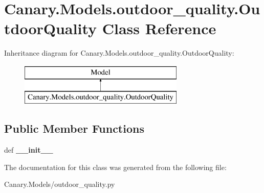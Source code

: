 \hypertarget{class_canary_8_models_1_1outdoor__quality_1_1_outdoor_quality}{\section{Canary.\-Models.\-outdoor\-\_\-quality.\-Outdoor\-Quality Class Reference}
\label{class_canary_8_models_1_1outdoor__quality_1_1_outdoor_quality}
}
Inheritance diagram for Canary.\-Models.\-outdoor\-\_\-quality.\-Outdoor\-Quality\-:\begin{figure}[H]
\begin{center}
\leavevmode
\includegraphics[height=2.000000cm]{class_canary_8_models_1_1outdoor__quality_1_1_outdoor_quality}
\end{center}
\end{figure}
\subsection*{Public Member Functions}
\begin{DoxyCompactItemize}
\item 
\hypertarget{class_canary_8_models_1_1outdoor__quality_1_1_outdoor_quality_ac8a21c90740c928d8e459bf8dad6dba1}{def {\bfseries \-\_\-\-\_\-init\-\_\-\-\_\-}}\label{class_canary_8_models_1_1outdoor__quality_1_1_outdoor_quality_ac8a21c90740c928d8e459bf8dad6dba1}

\end{DoxyCompactItemize}


The documentation for this class was generated from the following file\-:\begin{DoxyCompactItemize}
\item 
Canary.\-Models/outdoor\-\_\-quality.\-py\end{DoxyCompactItemize}
